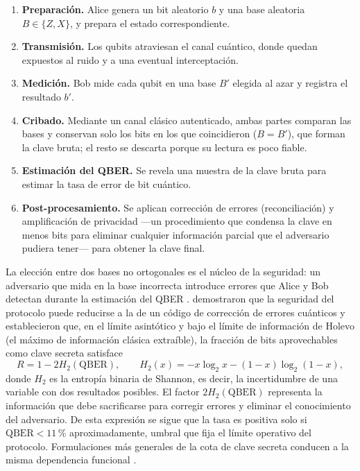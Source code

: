 \documentclass[12pt]{report}
\begin{document}
\begin{enumerate}
    \item \textbf{Preparación.} Alice genera un bit aleatorio $b$ y una base
    aleatoria $B \in \{Z, X\}$, y prepara el estado correspondiente.
    \item \textbf{Transmisión.} Los qubits atraviesan el canal cuántico, donde
    quedan expuestos al ruido y a una eventual interceptación.
    \item \textbf{Medición.} Bob mide cada qubit en una base $B'$ elegida al
    azar y registra el resultado $b'$.
    \item \textbf{Cribado.} Mediante un canal clásico autenticado, ambas partes
    comparan las bases y conservan solo los bits en los que coincidieron
    ($B = B'$), que forman la clave bruta; el resto se descarta porque su
    lectura es poco fiable.
    \item \textbf{Estimación del QBER.} Se revela una muestra de la clave bruta
    para estimar la tasa de error de bit cuántico.
    \item \textbf{Post-procesamiento.} Se aplican corrección de errores
    (reconciliación) y amplificación de privacidad —un procedimiento que
    condensa la clave en menos bits para eliminar cualquier información parcial
    que el adversario pudiera tener— para obtener la clave final.
\end{enumerate}

La elección entre dos bases no ortogonales es el núcleo de la seguridad: un
adversario que mida en la base incorrecta introduce errores que Alice y Bob
detectan durante la estimación del QBER \citep{gisin2002}. \citet{shor2000}
demostraron que la seguridad del protocolo puede reducirse a la de un código de
corrección de errores cuánticos y establecieron que, en el límite asintótico y
bajo el límite de información de Holevo (el máximo de información clásica
extraíble), la fracción de bits aprovechables como
clave secreta satisface
\begin{equation}
R = 1 - 2H_2(\mathrm{QBER}),
\qquad
H_2(x) = -x\log_2 x - (1-x)\log_2(1-x),
\label{eq:shor}
\end{equation}
donde $H_2$ es la entropía binaria de Shannon, es decir, la incertidumbre de una
variable con dos resultados posibles. El factor $2H_2(\mathrm{QBER})$
representa la información que debe sacrificarse para corregir errores y eliminar
el conocimiento del adversario. De esta expresión se sigue que la tasa es
positiva solo si $\mathrm{QBER} < 11$\,\% aproximadamente, umbral que fija el
límite operativo del protocolo. Formulaciones más generales de la cota de clave
secreta conducen a la misma dependencia funcional \citep{devetak2005}.
\end{document}
